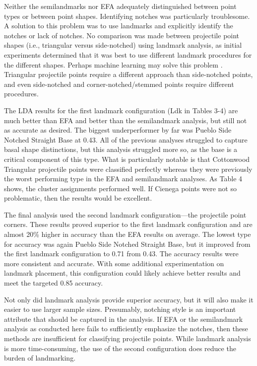 \documentclass[PCJ,Unicode,screen,mode=plain]{cedram}
\begin{document}
Neither the semilandmarks nor EFA adequately distinguished between point types or between point shapes. Identifying notches was particularly troublesome. A solution to this problem was to use landmarks and explicitly identify the notches or lack of notches. No comparison was made between projectile point shapes (i.e., triangular versus side-notched) using landmark analysis, as initial experiments determined that it was best to use different landmark procedures for the different shapes. Perhaps machine learning may solve this problem \autocites[see][]{Castillo_Flores2019-cs,MacLeod2018-aj,Nash2016-mc}. Triangular projectile points require a different approach than side-notched points, and even side-notched and corner-notched/stemmed points require different procedures.

The LDA results for the first landmark configuration (Ldk in Tables 3-4) are much better than EFA and better than the semilandmark analysis, but still not as accurate as desired. The biggest underperformer by far was Pueblo Side Notched Straight Base at 0.43. All of the previous analyses struggled to capture basal shape distinctions, but this analysis struggled more so, as the base is a critical component of this type. What is particularly notable is that Cottonwood Triangular projectile points were classified perfectly whereas they were previously the worst performing type in the EFA and semilandmark analyses. As Table 4 shows, the cluster assignments performed well. If Cienega points were not so problematic, then the results would be excellent.

The final analysis used the second landmark configuration---the projectile point corners. These results proved superior to the first landmark configuration and are almost 20\% higher in accuracy than the EFA results on average. The lowest type for accuracy was again Pueblo Side Notched Straight Base, but it improved from the first landmark configuration to 0.71 from 0.43. The accuracy results were more consistent and accurate. With some additional experimentation on landmark placement, this configuration could likely achieve better results and meet the targeted 0.85 accuracy.

Not only did landmark analysis provide superior accuracy, but it will also make it easier to use larger sample sizes. Presumably, notching style is an important attribute that should be captured in the analysis. If EFA or the semilandmark analysis as conducted here fails to sufficiently emphasize the notches, then these methods are insufficient for classifying projectile points. While landmark analysis is more time-consuming, the use of the second configuration does reduce the burden of landmarking.
\end{document}

